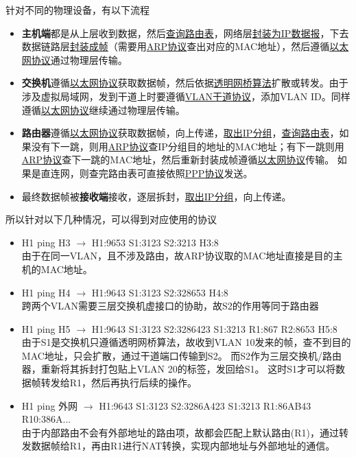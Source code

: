 \begin{analysis}
	针对不同的物理设备，有以下流程
	\begin{itemize}
	\item \textbf{主机端}都是从上层收到数据，然后\underline{查询路由表}，网络层\underline{封装为IP数据报}，下去数据链路层\underline{封装成帧}（需要用\underline{ARP协议}查出对应的MAC地址），然后遵循\underline{以太网协议}通过物理层传输。
	\item \textbf{交换机}遵循\underline{以太网协议}获取数据帧，然后依据\underline{透明网桥算法}扩散或转发。由于涉及虚拟局域网，发到干道上时要遵循\underline{VLAN干道协议}，添加VLAN ID。同样遵循\underline{以太网协议}继续通过物理层传输。
	\item \textbf{路由器}遵循\underline{以太网协议}获取数据帧，向上传递，\underline{取出IP分组}，\underline{查询路由表}，如果没有下一跳，则用\underline{ARP协议}查IP分组目的地址的MAC地址；有下一跳则用\underline{ARP协议}查下一跳的MAC地址，然后重新封装成帧遵循\underline{以太网协议}传输。
	如果是直连网，则查完路由表可直接依照\underline{PPP协议}发送。
	\item 最终数据帧被\textbf{接收端}接收，逐层拆封，\underline{取出IP分组}，向上传递。
	\end{itemize}
	所以针对以下几种情况，可以得到对应使用的协议
	\begin{itemize}
		\item H1 ping H3 $\to$ H1:9653  S1:3123   S2:3213  H3:8\\
		由于在同一VLAN，且不涉及路由，故ARP协议取的MAC地址直接是目的主机的MAC地址。
		\item H1 ping H4 $\to$ H1:9643  S1:3123   S2:328653 H4:8\\
		跨两个VLAN需要三层交换机虚接口的协助，故S2的作用等同于路由器
		\item H1 ping H5 $\to$ H1:9643  S1:3123   S2:3286423 S1:3213 R1:867 R2:8653 H5:8\\
		由于S1是交换机只遵循透明网桥算法，故收到VLAN 10发来的帧，查不到目的MAC地址，只会扩散，通过干道端口传输到S2。
		而S2作为三层交换机/路由器，重新将其拆封打包贴上VLAN 20的标签，发回给S1。
		这时S1才可以将数据帧转发给R1，然后再执行后续的操作。
		\item H1 ping 外网 $\to$ H1:9643  S1:3123   S2:3286A423 S1:3213 R1:86AB43 R10:386A...\\
		由于内部路由不会有外部地址的路由项，故都会匹配上默认路由(R1)，通过转发数据帧给R1，再由R1进行NAT转换，实现内部地址与外部地址的通信。
	\end{itemize}
\end{analysis}

